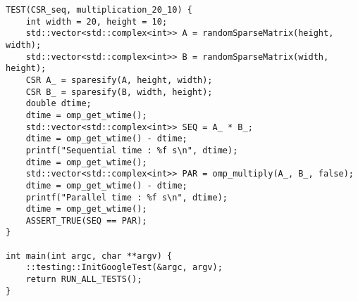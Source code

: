 \documentclass{report}
\begin{document}
\begin{lstlisting}
TEST(CSR_seq, multiplication_20_10) {
    int width = 20, height = 10;
    std::vector<std::complex<int>> A = randomSparseMatrix(height, width);
    std::vector<std::complex<int>> B = randomSparseMatrix(width, height);
    CSR A_ = sparesify(A, height, width);
    CSR B_ = sparesify(B, width, height);
    double dtime;
    dtime = omp_get_wtime();
    std::vector<std::complex<int>> SEQ = A_ * B_;
    dtime = omp_get_wtime() - dtime;
    printf("Sequential time : %f s\n", dtime);
    dtime = omp_get_wtime();
    std::vector<std::complex<int>> PAR = omp_multiply(A_, B_, false);
    dtime = omp_get_wtime() - dtime;
    printf("Parallel time : %f s\n", dtime);
    dtime = omp_get_wtime();
    ASSERT_TRUE(SEQ == PAR);
}

int main(int argc, char **argv) {
    ::testing::InitGoogleTest(&argc, argv);
    return RUN_ALL_TESTS();
}
\end{lstlisting}
\end{document}
